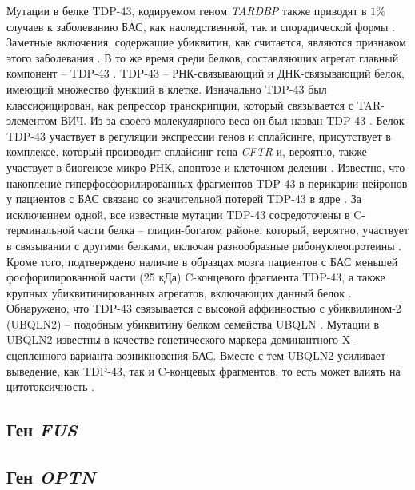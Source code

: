 Мутации в белке TDP-43, кодируемом геном \textit{TARDBP} также приводят в $1$\% случаев к заболеванию БАС, как наследственной, так и спорадической формы \cite{Corrado2009}. Заметные включения, содержащие убиквитин, как считается, являются признаком этого заболевания \cite{Kabashi2008,VanDeerlin2008}. В то же время среди белков, составляющих агрегат главный компонент -- TDP-43 \cite{Sreedharan2008,Kabashi2008,Kuhnlein2008}. TDP-43 -- РНК-связывающий и ДНК-связывающий белок, имеющий множество функций в клетке. Изначально TDP-43 был классифицирован, как репрессор транскрипции, который связывается с TAR-элементом ВИЧ. Из-за своего молекулярного веса он был назван TDP-43 \cite{VanDeerlin2008}. Белок TDP-43 участвует в регуляции экспрессии генов и сплайсинге, присутствует в комплексе, который производит сплайсинг гена \textit{CFTR} и, вероятно, также участвует в биогенезе микро-РНК, апоптозе и клеточном делении \cite{Sreedharan2008,VanDeerlin2008}. Известно, что накопление гиперфосфорилированных фрагментов TDP-43 в перикарии нейронов у пациентов с БАС связано со значительной потерей TDP-43 в ядре \cite{Sreedharan2008}. За исключением одной, все известные мутации TDP-43 сосредоточены в C-терминальной части белка -- глицин-богатом районе, который, вероятно, участвует в связывании с другими белками, включая разнообразные рибонуклеопротеины \cite{Corrado2009}. Кроме того, подтверждено наличие в образцах мозга пациентов с БАС меньшей фосфорилированной части (25 кДа) C-концевого фрагмента TDP-43, а также крупных убиквитинированных агрегатов, включающих данный белок \cite{Corrado2009}. Обнаружено, что TDP-43 связывается с высокой аффинностью с убиквилином-2 (UBQLN2) -- подобным убиквитину белком семейства UBQLN \cite{Cassel2013}. Мутации в UBQLN2 известны в качестве генетического маркера доминантного X-сцепленного варианта возникновения БАС. Вместе с тем UBQLN2 усиливает выведение, как TDP-43, так и C-концевых фрагментов, то есть может влиять на цитотоксичность \cite{Cassel2013}.

\subsection{Ген \textit{FUS}} \label{subsect_FUS}

\subsection{Ген \textit{OPTN}} \label{subsect_OPTN}


